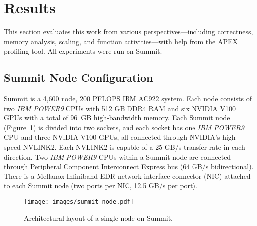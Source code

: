 \section{Results}
\label{sec:results}
This section evaluates this work from various perspectives---including correctness, memory analysis, scaling, and function activities---with help from the APEX profiling tool. All experiments were run on 
Summit.

\subsection{Summit Node Configuration}
Summit is a 4,600 node, 200 PFLOPS IBM AC922 
system. 
Each node consists of two \emph{IBM
POWER9} CPUs with 512 GB DDR4 RAM and six NVIDIA V100 GPUs with a total of 96~GB
high-bandwidth memory. 
%
Each Summit node (Figure~\ref{fig:summit_node}) is divided into two sockets, and each socket has one \emph{IBM
POWER9} CPU and three NVIDIA V100 GPUs, all connected through NVIDIA's high-speed NVLINK2. Each NVLINK2 is capable of a 25 GB/s transfer rate in each direction.
%
Two \emph{IBM POWER9} CPUs within a Summit node are connected through 
Peripheral Component Interconnect Express bus (64 GB/s bidirectional). 
%
There is a Mellanox Infiniband EDR network interface connector (NIC) attached to
each Summit node (two ports per NIC, 12.5 GB/s per port).


\begin{figure}
	\centering
	\texttt{[image: images/summit\_node.pdf]}
	\caption{Architectural layout of a single node on Summit.}
	\label{fig:summit_node}
\end{figure}

